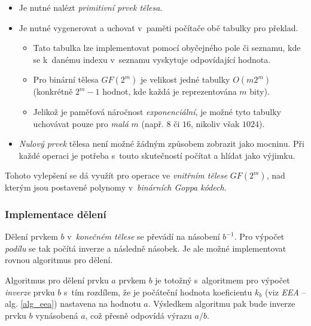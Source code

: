 \documentclass[thesis=M,czech,hidelinks]{FITthesis}[2012/06/26]
\newcommand{\0}{{\textcolor[gray]{0.80}{0}}}
\begin{document}
\begin{itemize}
    \item Je nutné nalézt \emph{primitivní prvek tělesa}.

    \item Je nutné vygenerovat a uchovat v~paměti počítače obě tabulky pro
        překlad.
        \begin{itemize}
            \item Tato tabulka lze implementovat pomocí obyčejného pole či
                sezna\-mu, kde se k~danému indexu v~seznamu vyskytuje
                odpovídající hodnota.
            \item Pro binární  tělesa $GF(2^m)$ je velikost jedné tabulky
                $O(m 2^m)$ (konkrétně $2^m - 1$ hodnot, kde každá je
                reprezentována $m$ bity).
            \item Jelikož je paměťová náročnost \emph{exponenciální}, je
                možné tyto tabulky uchovávat pouze pro \emph{malá} $m$ (např.
                $8$ či $16$, nikoliv však $1024$).
        \end{itemize}

    \item \emph{Nulový prvek} tělesa není možné žádným způsobem zobrazit jako
        mocninu. Při každé operaci je potřeba s~touto skutečností počítat
        a hlídat jako výjimku.

\end{itemize}


Tohoto vylepšení se dá využít pro operace ve \emph{vnitřním tělese}
$GF(2^m)$, nad kterým jsou postavené polynomy v~\emph{binárních Goppa kódech}.


\subsubsection{Implementace dělení}
Dělení prvkem $b$ v~\emph{konečném tělese} se převádí na násobení $b^{-1}$. Pro
výpočet \emph{podílu} se tak počítá inverze a následně násobek. Je ale možné
implementovat rovnou algoritmus pro dělení.

Algoritmus pro dělení prvku $a$ prvkem $b$ je totožný s~algoritmem pro výpočet
\emph{inverze} prvku $b$ s~tím rozdílem, že je počáteční hodnota koeficientu
$k_b$ (viz \emph{EEA} -- alg. \ref{alg_eea}) nastavena na hodnotu $a$.
%
Výsledkem algoritmu pak bude inverze prvku $b$ vynásobená $a$, což přesně
odpovídá výrazu $a/b$.
\end{document}
